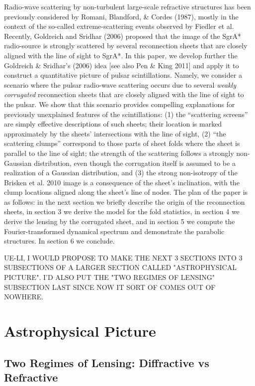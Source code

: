 \documentclass[useAMS,usenatbib]{mn2e}
\begin{document}
Radio-wave scattering by non-turbulent large-scale refractive structures has been previously
considered by Romani, Blandford, \& Cordes (1987), mostly in the context of the so-called
extreme-scattering events observed by Fiedler et al. Recently, Goldreich and Sridhar (2006) proposed that the image of the SgrA* radio-source is 
strongly scattered by several reconnection sheets that are closely aligned with the line of sight to
SgrA*.
In this paper, we develop further the Goldreich \& Sridhar's (2006) idea [see also Pen \& King 2011] 
and apply it to construct a quantitative
picture of pulsar scintillations. Namely, we consider a scenario where
the pulsar radio-wave scattering occurs due to several {\it weakly corrugated} 
reconnection sheets that are
closely aligned with the line of sight to the pulsar.  We show that this scenario provides
compelling explanations for previously unexplained features of the scintillations: 
(1)  the ``scattering screens'' are simply effective descriptions of such sheets; their location is marked 
approximately
by the sheets' intersections with the line of sight, (2) ``the scattering clumps'' correspond to 
those parts of sheet folds where the sheet is parallel 
to
the line of sight; the strength of the scattering follows a strongly non-Gaussian distribution, even though
the corrugation itself is assumed to be a realization of a Gaussian distribution, and (3) the
strong non-isotropy of the Brisken et al. 2010 image is a consequence of the sheet's inclination, 
with the clump locations aligned along the sheet's line of nodes. The plan of the paper is
as follows: in the next section we briefly describe the origin of the
reconnection sheets, in section 3  we derive the model for the fold statistics,
in section 4 we derive the lensing by the corrugated sheet, and in section 5 we compute the
Fourier-transformed dynamical spectrum and demonstrate the parabolic structures. In section 6 we conclude.

UE-LI, I WOULD PROPOSE TO MAKE THE NEXT 3 SECTIONS INTO 3 SUBSECTIONS OF A LARGER SECTION
CALLED "ASTROPHYSICAL PICTURE".  I'D ALSO PUT  THE "TWO REGIMES OF LENSING" SUBSECTION
LAST SINCE NOW IT SORT OF COMES OUT OF NOWHERE.

\section{Astrophysical Picture}

\subsection{Two Regimes of Lensing: Diffractive vs Refractive}
\end{document}
